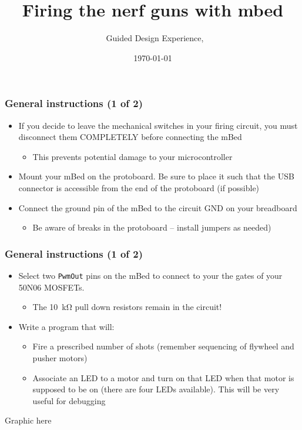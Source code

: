 \documentclass[aspectratio=169]{beamer}
\title{Firing the nerf guns with mbed}
\subtitle{\usnaCourseNumber\ Guided Design Experience, \usnaCourseTerm}
\author{\usnaInstructorShort}
\date{\today}
\begin{document}
\settitlebg
\begin{frame}
\titlepage
\end{frame}

\setslidebg
\begin{frame}
\frametitle{General instructions (1 of 2)}
\begin{itemize}
\item If you decide to leave the mechanical switches in your firing circuit, you must disconnect them COMPLETELY before connecting the mBed
\begin{itemize}
\item This prevents potential damage to your microcontroller
\end{itemize}
\item Mount your mBed on the protoboard.  Be sure to place it such that the USB connector is accessible from the end of the protoboard (if possible)
\item Connect the ground pin of the mBed to the circuit GND on your breadboard
\begin{itemize}
\item Be aware of breaks in the protoboard – install jumpers as needed)
\end{itemize}
\end{itemize}
\end{frame}

\begin{frame}
\frametitle{General instructions (1 of 2)}
\begin{itemize}
\item Select two \lstinline{PwmOut} pins on the mBed to connect to your the gates of your 50N06 MOSFETs.
\begin{itemize}
\item The \SI{10}{\kilo\ohm} pull down resistors remain in the circuit!
\end{itemize}
\item Write a program that will:
\begin{itemize}
\item Fire a prescribed number of shots (remember sequencing of flywheel and pusher motors)
\item Associate an LED to a motor and turn on that LED when that motor is supposed to be on (there are four LEDs available).  This will be very useful for debugging
\end{itemize}
\end{itemize}
\end{frame}

\begin{frame}
Graphic here
\end{frame}
\end{document}
